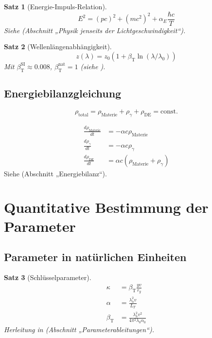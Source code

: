 \documentclass[a4paper,12pt]{article}
\newtheorem{theorem}{Satz}[section]
\theoremstyle{definition}
\theoremstyle{remark}
\newcommand{\betaT}{\beta_{\text{T}}}
\begin{document}
\begin{theorem}[Energie-Impuls-Relation]
	\begin{equation}
		E^2 = (p c)^2 + (m c^2)^2 + \alpha_E \frac{\hbar c}{T}
	\end{equation}
	Siehe \cite{pascher_photons_2025} (Abschnitt „Physik jenseits der Lichtgeschwindigkeit“).
\end{theorem}

\begin{theorem}[Wellenlängenabhängigkeit]
	\begin{equation}
		z(\lambda) = z_0 (1 + \betaT \ln(\lambda/\lambda_0))
	\end{equation}
	Mit \(\betaT^{\text{SI}} \approx 0.008\), \(\betaT^{\text{nat}} = 1\) (siehe \cite{pascher_params_2025}).
\end{theorem}

\subsection{Energiebilanzgleichung}

\begin{equation}
	\rho_{\text{total}} = \rho_{\text{Materie}} + \rho_{\gamma} + \rho_{\text{DE}} = \text{const.}
\end{equation}

\begin{align}
	\frac{d \rho_{\text{Materie}}}{d t} &= -\alpha c \rho_{\text{Materie}} \\
	\frac{d \rho_{\gamma}}{d t} &= -\alpha c \rho_{\gamma} \\
	\frac{d \rho_{\text{DE}}}{d t} &= \alpha c (\rho_{\text{Materie}} + \rho_{\gamma})
\end{align}
Siehe \cite{pascher_messdifferenzen_2025} (Abschnitt „Energiebilanz“).

\section{Quantitative Bestimmung der Parameter}

\subsection{Parameter in natürlichen Einheiten}

\begin{theorem}[Schlüsselparameter]
	\begin{align}
		\kappa &= \betaT \frac{y v}{r_g} \\
		\alpha &= \frac{\lambda_h^2 v}{L_T} \\
		\betaT &= \frac{\lambda_h^2 v^2}{4\pi^2 \lambda_0 \alpha_0}
	\end{align}
	Herleitung in \cite{pascher_params_2025} (Abschnitt „Parameterableitungen“).
\end{theorem}
\end{document}
